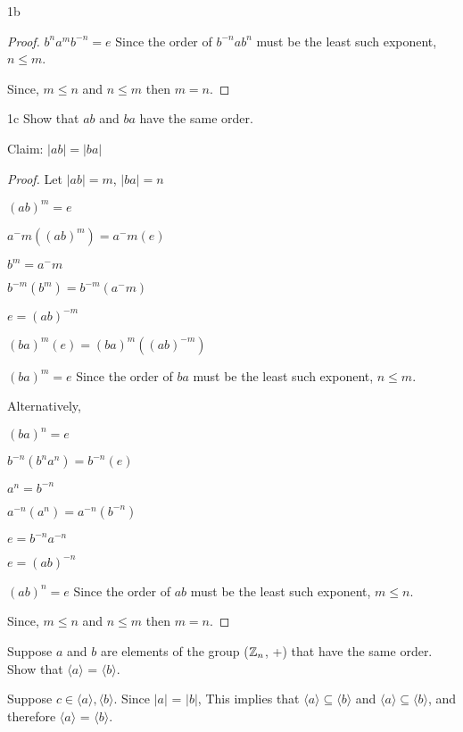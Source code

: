 \begin{question}{1}
\begin{question}{1b}
\begin{proof}
$b^na^mb^{-n} = e$ Since the order of $b^{-n}ab^n$ must be the least such exponent, $n \leq m$.

Since, $m \leq n$ and $n \leq m$ then $m = n$.
\end{proof}
\end{question}

\begin{question}{1c} Show that $ab$ and $ba$ have the same order.

Claim: $|ab| = |ba|$
\begin{proof}
Let $|ab|=m$, $|ba|=n$

$(ab)^m = e$

$a^-m((ab)^m) = a^-m(e)$

$b^m = a^-m$

$b^{-m}(b^m) = b^{-m}(a^-m)$

$e = (ab)^{-m}$

$(ba)^m(e) = (ba)^m((ab)^{-m})$

$(ba)^m = e$ Since the order of $ba$ must be the least such exponent, $n \leq m$.

Alternatively,

$(ba)^n = e$

$b^{-n}(b^na^n) = b^{-n}(e)$

$a^n = b^{-n}$

$a^{-n}(a^n) = a^{-n}(b^{-n})$

$e = b^{-n}a^{-n}$

$e = (ab)^{-n}$

$(ab)^n = e$ Since the order of $ab$ must be the least such exponent, $m \leq n$.

Since, $m \leq n$ and $n \leq m$ then $m = n$.
\end{proof}
\end{question}
\end{question}


\begin{question}{2}
Suppose $a$ and $b$ are elements of the group ($\mathbb{Z}_n$, +) that have the same order. Show
that $\langle a \rangle$ = $\langle b \rangle$.

Suppose $c \in \langle a \rangle, \langle b \rangle$. Since $|a|$ = $|b|$, This implies that $\langle a \rangle \subseteq \langle b \rangle$ and $\langle a \rangle \subseteq \langle b \rangle$, and therefore $\langle a \rangle$ = $\langle b \rangle$.

\end{question}

